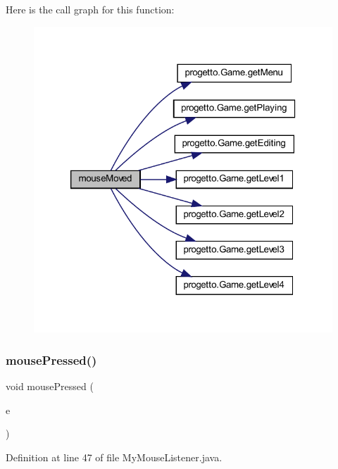 Here is the call graph for this function\+:\nopagebreak
\begin{figure}[H]
\begin{center}
\leavevmode
\includegraphics[width=320pt]{classinputs_1_1_my_mouse_listener_a2ca251710b65639ec80bc141edde60aa_cgraph}
\end{center}
\end{figure}
\mbox{\label{classinputs_1_1_my_mouse_listener_aed82e1ce3dd3cf283d508c3ba3be70ef}} 
\subsubsection{\texorpdfstring{mouse\+Pressed()}{mousePressed()}}
{\footnotesize\ttfamily void mouse\+Pressed (\begin{DoxyParamCaption}\item[{Mouse\+Event}]{e }\end{DoxyParamCaption})}



Definition at line 47 of file My\+Mouse\+Listener.\+java.

